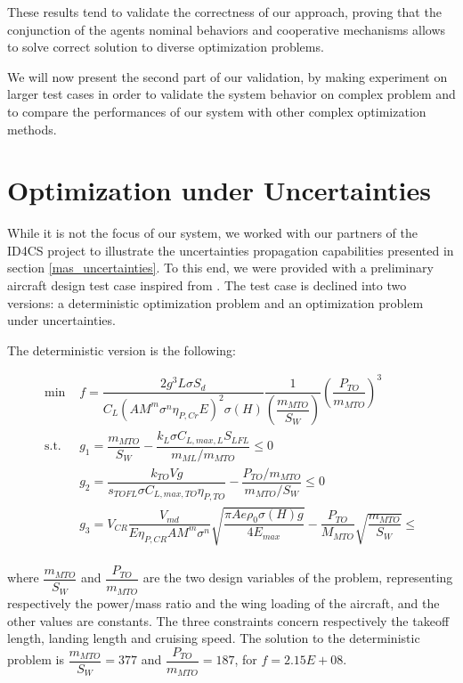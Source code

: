 These results tend to validate the correctness of our approach, proving that the conjunction of the agents nominal behaviors and cooperative mechanisms allows to solve correct solution to diverse optimization problems.

We will now present the second part of our validation, by making experiment on larger test cases in order to validate the system behavior on complex problem and to compare the performances of our system with other complex optimization methods.

\section{Optimization under Uncertainties}

While it is not the focus of our system, we worked with our partners of the ID4CS project to illustrate the uncertainties propagation capabilities presented in section \ref{mas_uncertainties}. To this end, we were provided with a preliminary aircraft design test case inspired from \cite{scholz2008preliminary}. The test case is declined into two versions: a deterministic optimization problem and an optimization problem under uncertainties.

The deterministic version is the following:

\begin{align*}
	\text{min }& f = \dfrac{2 g^3 L \sigma S_d}{C_L (A M^m {\sigma}^n \eta_{P,Cr} E)^2 \sigma (H)} \dfrac{1}{ \left( \dfrac{m_{MTO}}{S_W} \right) } \left(\dfrac{P_{TO}}{m_{MTO}}\right)^3  \\
	\text{s.t. } & g_1 = \dfrac{m_{MTO}}{S_W} - \dfrac{k_L \sigma C_{L, max, L} S_{LFL}}{ m_{ML}/m_{MTO}}\leq 0 \\
						&	g_2 = \dfrac{k_{TO} V g }{s_{TOFL} \sigma C_{L, max, TO} \eta_{P, TO}} - \dfrac{P_{TO}/m_{MTO}}{m_{MTO}/S_W} \leq 0\\
						&	g_3 = V_{CR}\dfrac{V_{md}}{E \eta_{P, CR} A M^m {\sigma}^n} \sqrt{\dfrac{\pi A e {\rho}_0 \sigma(H)g}{4 E_{max}}} - \dfrac{P_{TO}}{M_{MTO}} \sqrt{\dfrac{m_{MTO}}{S_W}} \leq \\
\end{align*}

where $\dfrac{m_{MTO}}{S_W}$ and $\dfrac{P_{TO}}{m_{MTO}}$ are the two design variables of the problem, representing respectively the power/mass ratio and the wing loading of the aircraft, and the other values are constants. The three constraints concern respectively the takeoff length, landing length and cruising speed. The solution to the deterministic problem is $\dfrac{m_{MTO}}{S_W} = 377$ and $\dfrac{P_{TO}}{m_{MTO}} = 187$, for $f = 2.15E+08$.


